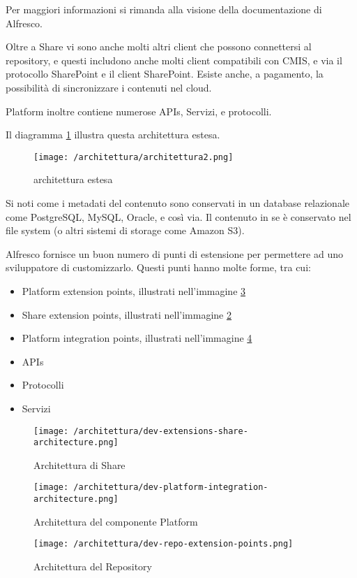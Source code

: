 Per maggiori informazioni si rimanda alla visione della documentazione di Alfresco.

Oltre a Share vi sono anche molti altri client che possono connettersi al repository, e questi includono anche molti client compatibili con CMIS, e via il protocollo SharePoint e il client SharePoint. Esiste anche, a pagamento, la possibilità di sincronizzare i contenuti nel cloud.

Platform inoltre contiene numerose APIs, Servizi, e protocolli.

Il diagramma \ref{fig:architettura-estesa} illustra questa architettura estesa.

\begin{figure}[!ht]
\centering
\texttt{[image: /architettura/architettura2.png]}
\caption{architettura estesa\label{fig:architettura-estesa}}
\end{figure}

Si noti come i metadati del contenuto sono conservati in un database relazionale come PostgreSQL, MySQL, Oracle, e così via. Il contenuto in se è conservato nel file system (o altri sistemi di storage come Amazon S3).

Alfresco fornisce un buon numero di punti di estensione per permettere ad uno sviluppatore di customizzarlo. Questi punti hanno molte forme, tra cui:
\begin{itemize}
\item Platform extension points, illustrati nell'immagine \ref{fig:dev-platform-integration-architecture.png}
\item Share extension points, illustrati nell'immagine \ref{fig:dev-extensions-share-architecture}
\item Platform integration points, illustrati nell'immagine \ref{fig:dev-repo-extension-points.png}
\item APIs
\item Protocolli
\item Servizi
\end{itemize}
\begin{figure}[!ht]
\centering
\texttt{[image: /architettura/dev-extensions-share-architecture.png]}
\caption{Architettura di Share\label{fig:dev-extensions-share-architecture}}
\end{figure}
\begin{figure}[!ht]
\centering
\texttt{[image: /architettura/dev-platform-integration-architecture.png]}
\caption{Architettura del componente Platform\label{fig:dev-platform-integration-architecture.png}}
\end{figure}
\begin{figure}[!ht]
\centering
\texttt{[image: /architettura/dev-repo-extension-points.png]}
\caption{Architettura del Repository\label{fig:dev-repo-extension-points.png}}
\end{figure}
